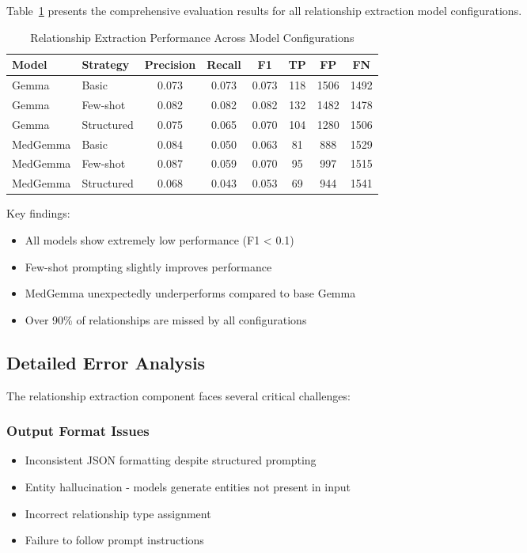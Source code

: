 Table~\ref{tab:relation-extraction} presents the comprehensive evaluation results for all relationship extraction model configurations.

\begin{table}[htbp]
\centering
\caption{Relationship Extraction Performance Across Model Configurations}
\label{tab:relation-extraction}
\begin{tabular}{llcccccc}
\toprule
\textbf{Model} & \textbf{Strategy} & \textbf{Precision} & \textbf{Recall} & \textbf{F1} & \textbf{TP} & \textbf{FP} & \textbf{FN} \\
\midrule
Gemma & Basic & 0.073 & 0.073 & 0.073 & 118 & 1506 & 1492 \\
Gemma & Few-shot & 0.082 & 0.082 & 0.082 & 132 & 1482 & 1478 \\
Gemma & Structured & 0.075 & 0.065 & 0.070 & 104 & 1280 & 1506 \\
MedGemma & Basic & 0.084 & 0.050 & 0.063 & 81 & 888 & 1529 \\
MedGemma & Few-shot & 0.087 & 0.059 & 0.070 & 95 & 997 & 1515 \\
MedGemma & Structured & 0.068 & 0.043 & 0.053 & 69 & 944 & 1541 \\
\bottomrule
\end{tabular}
\end{table}

Key findings:
\begin{itemize}
    \item All models show extremely low performance (F1 < 0.1)
    \item Few-shot prompting slightly improves performance
    \item MedGemma unexpectedly underperforms compared to base Gemma
    \item Over 90\% of relationships are missed by all configurations
\end{itemize}

\subsection{Detailed Error Analysis}

The relationship extraction component faces several critical challenges:

\subsubsection{Output Format Issues}
\begin{itemize}
    \item Inconsistent JSON formatting despite structured prompting
    \item Entity hallucination - models generate entities not present in input
    \item Incorrect relationship type assignment
    \item Failure to follow prompt instructions
\end{itemize}


